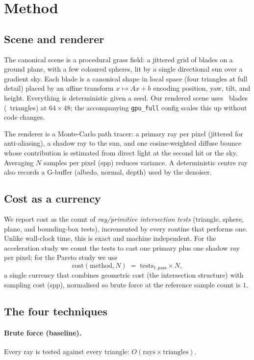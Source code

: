 \section{Method}
\label{sec:method}

\subsection{Scene and renderer}
The canonical scene is a procedural grass field: a jittered grid of blades on a
ground plane, with a few coloured spheres, lit by a single directional sun over
a gradient sky. Each blade is a canonical shape in local space (four triangles
at full detail) placed by an affine transform $x \mapsto Ax + b$ encoding
position, yaw, tilt, and height. Everything is deterministic given a seed. Our
rendered scene uses \SceneBlades\ blades (\SceneTris\ triangles) at
$64\times48$; the accompanying \texttt{gpu\_full} config scales this up without
code changes.

The renderer is a Monte-Carlo path tracer: a primary ray per pixel (jittered for
anti-aliasing), a shadow ray to the sun, and one cosine-weighted diffuse bounce
whose contribution is estimated from direct light at the second hit or the sky.
Averaging $N$ samples per pixel (spp) reduces variance. A deterministic centre
ray also records a G-buffer (albedo, normal, depth) used by the denoiser.

\subsection{Cost as a currency}
We report cost as the count of \emph{ray/primitive intersection tests}
(triangle, sphere, plane, and bounding-box tests), incremented by every routine
that performs one. Unlike wall-clock time, this is exact and machine
independent. For the acceleration study we count the tests to cast one primary
plus one shadow ray per pixel; for the Pareto study we use
\begin{equation}
\text{cost}(\text{method}, N) \;=\; \text{tests}_{\text{1 pass}} \times N,
\end{equation}
a single currency that combines geometric cost (the intersection structure) with
sampling cost (spp), normalised so brute force at the reference sample count is
$1$.

\subsection{The four techniques}
\paragraph{Brute force (baseline).} Every ray is tested against every triangle:
$O(\text{rays}\times\text{triangles})$.

